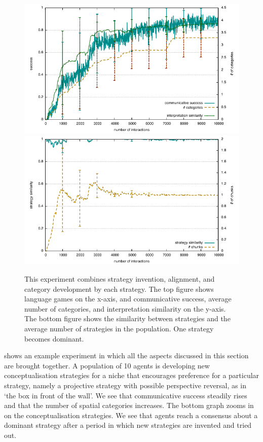\begin{figure}
\begin{center}
\includegraphics[width=\textwidth]{chap12/figs/chunk-alignment-category-invention-success.pdf}
\includegraphics[width=\textwidth]{chap12/figs/chunk-alignment-category-invention-alignment.pdf}
\caption{This experiment combines strategy invention, alignment, and category development by each strategy. The top figure
shows language games on the x-axis, and communicative success, average 
number of categories, and interpretation similarity on the y-axis. The bottom figure shows the similarity between 
strategies and the average number of strategies in the population. One strategy becomes dominant.}
\label{fig:all}
\end{center}
\end{figure}

 shows an example experiment in which all the aspects discussed in this section are brought together. 
A population of 10 agents is developing new conceptualisation strategies for a niche that encourages preference 
for a particular strategy, namely a projective strategy with possible perspective reversal, as in `the box in front 
of the wall'. We see that communicative success steadily rises and that the number of 
spatial categories increases. The bottom graph zooms in on the conceptualisation strategies. We see that agents reach 
a consensus about a dominant strategy after a period in which new strategies 
are invented and tried out. 


